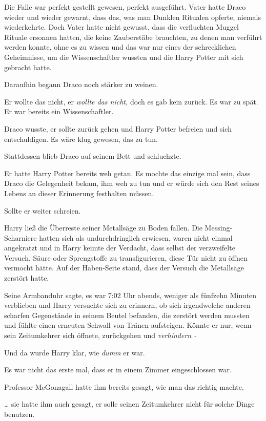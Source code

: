 {Die Falle war perfekt gestellt gewesen, perfekt ausgeführt. Vater hatte Draco wieder und wieder gewarnt, dass das, was man Dunklen Ritualen opferte, niemals wiederkehrte. Doch Vater hatte nicht gewusst, dass die verfluchten Muggel Rituale ersonnen hatten, die keine Zauberstäbe brauchten, zu denen man verführt werden konnte, ohne es zu wissen und das war nur eines der schrecklichen Geheimnisse, um die Wissenschaftler wussten und die Harry Potter mit sich gebracht hatte.

Daraufhin begann Draco noch stärker zu weinen.

Er wollte das nicht, er \emph{wollte das nicht,} doch es gab kein zurück. Es war zu spät. Er war bereits ein Wissenschaftler.

Draco wusste, er sollte zurück gehen und Harry Potter befreien und sich entschuldigen. Es wäre klug gewesen, das zu tun.

Stattdessen blieb Draco auf seinem Bett und schluchzte.

Er hatte Harry Potter bereits weh getan. Es mochte das einzige mal sein, dass Draco die Gelegenheit bekam, ihm weh zu tun und er würde sich den Rest seines Lebens an dieser Erinnerung festhalten müssen.

Sollte er weiter schreien.

\later

Harry ließ die Überreste seiner Metallsäge zu Boden fallen. Die Messing-Scharniere hatten sich als undurchdringlich erwiesen, waren nicht einmal angekratzt und in Harry keimte der Verdacht, dass selbst der verzweifelte Versuch, Säure oder Sprengstoffe zu transfigurieren, diese Tür nicht zu öffnen vermocht hätte. Auf der Haben-Seite stand, dass der Versuch die Metallsäge zerstört hatte.

Seine Armbanduhr sagte, es war 7:02 Uhr abends, weniger als fünfzehn Minuten verblieben und Harry versuchte sich zu erinnern, ob sich irgendwelche anderen scharfen Gegenstände in seinem Beutel befanden, die zerstört werden mussten und fühlte einen erneuten Schwall von Tränen aufsteigen. Könnte er nur, wenn sein Zeitumkehrer sich öffnete, zurückgehen und \emph{verhindern -}

Und da wurde Harry klar, wie \emph{dumm} er war.

Es war nicht das erste mal, dass er in einem Zimmer eingeschlossen war.

Professor McGonagall hatte ihm bereits gesagt, wie man das richtig machte.

… sie hatte ihm auch gesagt, er solle seinen Zeitumkehrer nicht für solche Dinge benutzen.

}
